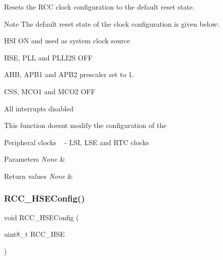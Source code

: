 Resets the R\+CC clock configuration to the default reset state. 

\begin{DoxyNote}{Note}
The default reset state of the clock configuration is given below\+:
\begin{DoxyItemize}
\item H\+SI ON and used as system clock source
\item H\+SE, P\+LL and P\+L\+L\+I2S O\+FF
\item A\+HB, A\+P\+B1 and A\+P\+B2 prescaler set to 1.
\item C\+SS, M\+C\+O1 and M\+C\+O2 O\+FF
\item All interrupts disabled 
\end{DoxyItemize}

This function doesn\textquotesingle{}t modify the configuration of the
\begin{DoxyItemize}
\item Peripheral clocks ~\newline
 -\/ L\+SI, L\+SE and R\+TC clocks 
\end{DoxyItemize}
\end{DoxyNote}

\begin{DoxyParams}{Parameters}
{\em None} & \\
\hline
\end{DoxyParams}

\begin{DoxyRetVals}{Return values}
{\em None} & \\
\hline
\end{DoxyRetVals}
\mbox{\label{group___r_c_c___group1_ga523b06e73f6aa8a03e42299c855066a8}} 
\subsubsection{\texorpdfstring{R\+C\+C\+\_\+\+H\+S\+E\+Config()}{RCC\_HSEConfig()}}
{\footnotesize\ttfamily void R\+C\+C\+\_\+\+H\+S\+E\+Config (\begin{DoxyParamCaption}\item[{uint8\+\_\+t}]{R\+C\+C\+\_\+\+H\+SE }\end{DoxyParamCaption})}



